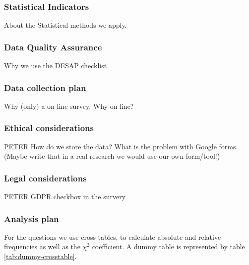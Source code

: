 \documentclass[12pt,a4paper,paper=a4,oneside,titlepage,pdftex]{scrartcl}
\begin{document}
\subsubsection{Statistical Indicators}
About the Statistical methods we apply.

\subsubsection{Data Quality Assurance}
Why we use the DESAP checklist

\subsubsection{Data collection plan}
Why (only) a on line survey. Why on line?


\subsubsection{Ethical considerations} PETER
How do we store the data? What is the problem with Google forms. (Maybe write that in a real research we would use our own form/tool!)

\subsubsection{Legal considerations} PETER
GDPR checkbox in the survery

\subsubsection{Analysis plan}
For the questions we use cross tables, to calculate absolute and relative frequencies as well as the $\chi^2$ coefficient. A dummy table is represented by table \ref{tab:dummy-crosstable}.
\end{document}
